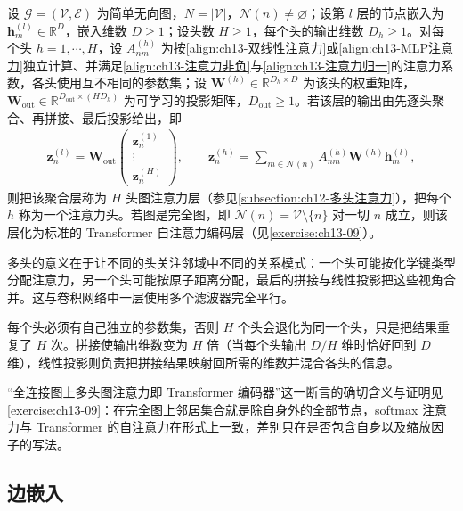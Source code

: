 \documentclass[../../main.tex]{subfiles}
\begin{document}
\begin{definition}[多头图注意力]\label{definition:ch13-多头图注意力}
设 $\mathcal{G}=(\mathcal{V},\mathcal{E})$ 为简单无向图，$N=|\mathcal{V}|$，$\mathcal{N}(n)\neq\varnothing$；设第 $l$ 层的节点嵌入为 $\bm{h}_m^{(l)}\in\mathbb{R}^{D}$，嵌入维数 $D\geqslant1$；设头数 $H\geqslant1$，每个头的输出维数 $D_h\geqslant1$。对每个头 $h=1,\cdots,H$，设 $A_{nm}^{(h)}$ 为按\eqref{align:ch13-双线性注意力}或\eqref{align:ch13-MLP注意力}独立计算、并满足\eqref{align:ch13-注意力非负}与\eqref{align:ch13-注意力归一}的注意力系数，各头使用互不相同的参数集；设 $\bm{W}^{(h)}\in\mathbb{R}^{D_h\times D}$ 为该头的权重矩阵，$\bm{W}_{\mathrm{out}}\in\mathbb{R}^{D_{\mathrm{out}}\times(HD_h)}$ 为可学习的投影矩阵，$D_{\mathrm{out}}\geqslant1$。若该层的输出由先逐头聚合、再拼接、最后投影给出，即
\begin{align*}
\bm{z}_n^{(l)}=\bm{W}_{\mathrm{out}}\begin{pmatrix}\bm{z}_n^{(1)}\\ \vdots\\ \bm{z}_n^{(H)}\end{pmatrix},\qquad \bm{z}_n^{(h)}=\sum_{m\in\mathcal{N}(n)}A_{nm}^{(h)}\bm{W}^{(h)}\bm{h}_m^{(l)},
\end{align*}
则把该聚合层称为 $H$ 头图注意力层（参见\cref{subsection:ch12-多头注意力}），把每个 $h$ 称为一个注意力头。若图是完全图，即 $\mathcal{N}(n)=\mathcal{V}\setminus\{n\}$ 对一切 $n$ 成立，则该层化为标准的 Transformer 自注意力编码层（见\cref{exercise:ch13-09}）。
\end{definition}

\begin{remark}
多头的意义在于让不同的头关注邻域中不同的关系模式：一个头可能按化学键类型分配注意力，另一个头可能按原子距离分配，最后的拼接与线性投影把这些视角合并。这与卷积网络中一层使用多个滤波器完全平行。\par
每个头必须有自己独立的参数集，否则 $H$ 个头会退化为同一个头，只是把结果重复了 $H$ 次。拼接使输出维数变为 $H$ 倍（当每个头输出 $D/H$ 维时恰好回到 $D$ 维），线性投影则负责把拼接结果映射回所需的维数并混合各头的信息。\par
“全连接图上多头图注意力即 Transformer 编码器”这一断言的确切含义与证明见\cref{exercise:ch13-09}：在完全图上邻居集合就是除自身外的全部节点，softmax 注意力与 Transformer 的自注意力在形式上一致，差别只在是否包含自身以及缩放因子的写法。
\end{remark}

\subsection{边嵌入}\label{subsection:ch13-边嵌入}
\end{document}
